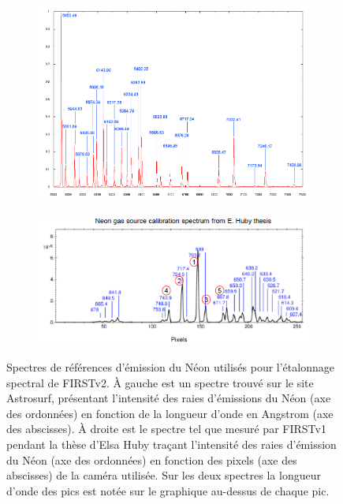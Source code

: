 \begin{figure}[ht!]
    \centering
    \begin{subfigure}{0.5\textwidth}
        \includegraphics[width=\textwidth]{Figure_Chap3/Neon_SpectrumReference_Astrosurf.png}
    \end{subfigure}%
    \begin{subfigure}{0.5\textwidth}
        \includegraphics[width=\textwidth]{Figure_Chap3/Neon_SpectrumReference_ThesisEHuby.png}
    \end{subfigure}
    \caption[Spectres de référence d'émission du Néon utilisés pour l'étalonnage spectral de FIRSTv2.]{Spectres de références d'émission du Néon utilisés pour l'étalonnage spectral de FIRSTv2. À gauche est un spectre trouvé sur le site Astrosurf, présentant l'intensité des raies d'émissions du Néon (axe des ordonnées) en fonction de la longueur d'onde en Angstrom (axe des abscisses). À droite est le spectre tel que mesuré par FIRSTv1 pendant la thèse d'Elsa Huby traçant l'intensité des raies d'émission du Néon (axe des ordonnées) en fonction des pixels (axe des abscisses) de la caméra utilisée. Sur les deux spectres la longueur d'onde des pics est notée sur le graphique au-dessus de chaque pic.}
    \label{fig:NeonReference}
\end{figure}

